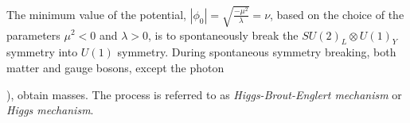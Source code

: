 The minimum value of the potential, $|\phi_{0}| = \sqrt{\frac{-\mu^{2}}{\lambda}}  = \nu $, based on the choice of the parameters $\mu^{2} < 0 $ and $ \lambda > 0$, is to spontaneously break the $SU(2)_{L} \otimes U(1)_{Y}$ symmetry into $U(1)$ symmetry.  During spontaneous symmetry breaking, both matter and gauge bosons, except the photon~{\Pphoton), obtain masses. The process is referred to as \textit{Higgs-Brout-Englert mechanism} or \textit{Higgs mechanism}.








}
